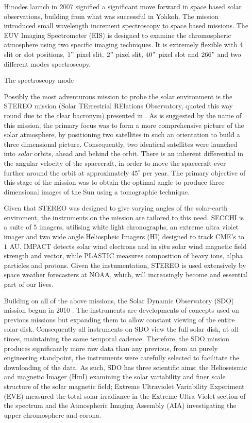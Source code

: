 Hinodes launch in 2007 signified a significant move forward in space based solar observations, building from what was successful in Yohkoh.
The mission introduced small wavelength increment spectroscopy to space based missions.
The EUV Imaging Spectrometer (EIS) is designed to examine the chromospheric atmosphere using two specific imaging techniques.
It is extremely flexible with 4 slit or slot positions, $1"$ pixel slit, $2"$ pixel slit, $40"$ pixel slot and $266"$ and two different modes spectroscopy.

The spectroscopy mode 
 


Possibly the most adventurous mission to probe the solar environment is the STEREO mission (Solar TErrestrial RElations Observatory, quoted this way round due to the clear bacronym) presented in \cite{Kaiser2008}.
As is suggested by the name of this mission, the primary focus was to form a more comprehensive picture of the solar atmosphere, by positioning two satellites in such an orientation to build a three dimensional picture.
Consequently, two identical satellites were launched into \emph{solar} orbits, ahead and behind the orbit.
There is an inherent differential in the angular velocity of the spacecraft, in order to move the spacecraft ever further around the orbit at approximately $45^\circ$ per year.
The primary objective of this stage of the mission was to obtain the optimal angle to produce three dimensional images of the Sun using a tomographic technique.

Given that STEREO was designed to give varying angles of the solar-earth  enviroment, the instruments on the mission are tailored to this need.
SECCHI is a suite of 5 imagers, utilising white light chronographs, an extreme ultra violet imager and two wide angle Heliospheic Imagers (HI) designed to track CME's to $1$ AU.
IMPACT detects solar wind electrons and in situ solar wind magnetic field strength and vector, while PLASTIC measures composition of heavy ions, alpha particles and protons. 
Given the instumentation, STEREO is used extensively by space weather forecasters at NOAA, which, will increasingly become and essential part of our lives.

Building on all of the above missions, the Solar Dynamic Observatory (SDO) mission begun in 2010 \cite{Kaiser2008}.
The instruments are developments of concepts used on previous missions but expanding them to allow constant viewing of the entire solar disk.
Consequently all instruments on SDO view the full solar disk, at all times, maintaining the same temporal cadence. 
Therefore, the SDO mission produces significantly more raw data than any previous, from an purely engineering standpoint, the instruments were carefully selected to facilitate the downloading of the data.
As such, SDO has three scientific aims; the Helioseismic and magnetic Imager (HmI) examining the solar variability and finer scale structure of the solar magnetic field; Extreme Ultraviolet Variability Experiment (EVE) measured the total solar irradiance in the Extreme Ultra Violet section of the spectrum and the Atmospheric Imaging Assembly (AIA) investigating the upper chromosphere and corona.

